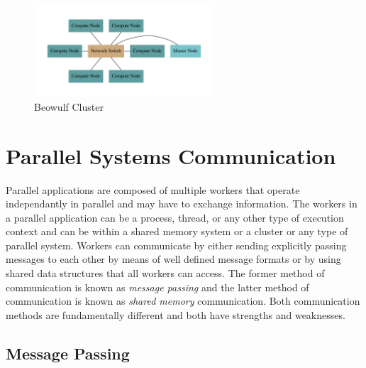 \documentclass[11pt]{book}
\begin{document}
\begin{figure}[H]
    \centering
    \includegraphics[width=0.6\textwidth,quiet]{figs/graphviz/beowulf.pdf}
    \caption{Beowulf Cluster}\label{beowulf}
\end{figure}

\section{Parallel Systems Communication}

Parallel applications are composed of multiple workers that operate independantly in parallel
and may have to exchange information. The workers in a parallel application can be a process,
thread, or any other type of execution context and can be within a shared memory system or a
cluster or any type of parallel system. Workers can communicate by either sending explicitly
passing messages to each other by means of well defined message formats or by using shared
data structures that all workers can access. The former method of communication is known as
\emph{message passing} and the latter method of communication is known as \emph{shared memory}
communication. Both communication methods are fundamentally different and both have strengths
and weaknesses.

\subsection{Message Passing}
\end{document}
